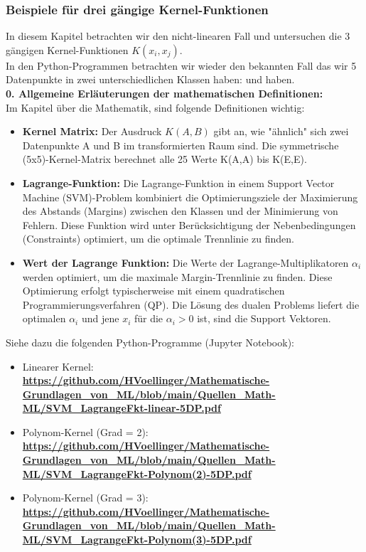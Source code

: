 \documentclass[12pt]{article}
\begin{document}
\subsubsection{Beispiele für drei gängige Kernel-Funktionen}
%
In diesem Kapitel betrachten wir den nicht-linearen Fall und untersuchen die 3 gängigen Kernel-Funktionen $ K(x_i,x_j) $.\\
In den Python-Programmen betrachten wir wieder den bekannten Fall das wir 5 Datenpunkte in zwei unterschiedlichen Klassen haben: {\color{red}{Klasse +1: A(1,1), B(-1,1)}} und {\color{blue}{Klasse -1: C(2,1), D(1,-2) und E(-2,1)}} haben.\\[0.2cm]  
%
\textbf{0. Allgemeine Erläuterungen der mathematischen Definitionen:}\\[0.2cm]
Im Kapitel über die Mathematik, sind folgende Definitionen wichtig:
\begin{itemize}
    \item \textbf{Kernel Matrix:} Der Ausdruck $ K(A,B) $ gibt an, wie "ähnlich" sich zwei Datenpunkte A und B im transformierten Raum sind. Die symmetrische (5x5)-Kernel-Matrix berechnet alle 25 Werte K(A,A) bis K(E,E).
    \item \textbf{Lagrange-Funktion:} Die Lagrange-Funktion in einem Support Vector Machine (SVM)-Problem kombiniert die Optimierungsziele der Maximierung des Abstands (Margins) zwischen den Klassen und der Minimierung von Fehlern. Diese Funktion wird unter Berücksichtigung der Nebenbedingungen (Constraints) optimiert, um die optimale Trennlinie zu finden.
    \item \textbf{Wert der Lagrange Funktion:} Die Werte der Lagrange-Multiplikatoren       $ \alpha_i $ werden optimiert, um die maximale Margin-Trennlinie zu finden. Diese Optimierung erfolgt typischerweise mit einem quadratischen Programmierungsverfahren (QP). Die Lösung des dualen Problems liefert die optimalen $ \alpha_i $ und jene $ x_i $ für die $ \alpha_i > 0$  ist, sind die Support Vektoren.
\end{itemize}
%
Siehe dazu die folgenden Python-Programme (Jupyter Notebook):
%
\begin{itemize}
    \item Linearer Kernel:\\ 
\textbf{\url{https://github.com/HVoellinger/Mathematische-Grundlagen_von_ML/blob/main/Quellen_Math-ML/SVM_LagrangeFkt-linear-5DP.pdf}}
    \item Polynom-Kernel (Grad = 2):\\
\textbf{\url{https://github.com/HVoellinger/Mathematische-Grundlagen_von_ML/blob/main/Quellen_Math-ML/SVM_LagrangeFkt-Polynom(2)-5DP.pdf}} 
    \item Polynom-Kernel (Grad = 3):\\
\textbf{\url{https://github.com/HVoellinger/Mathematische-Grundlagen_von_ML/blob/main/Quellen_Math-ML/SVM_LagrangeFkt-Polynom(3)-5DP.pdf}}   
\end{itemize}  
\end{document}

